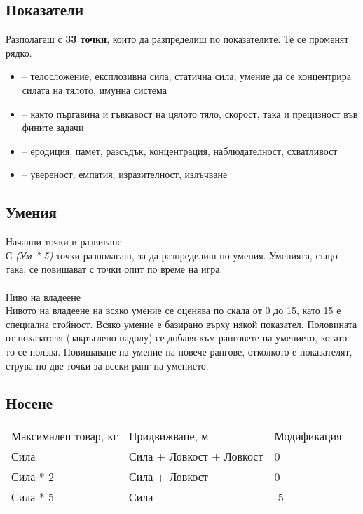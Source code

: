 \subsection{Показатели}
Разполагаш с \textbf{33 точки}, които да разпределиш по показателите. Те се променят рядко.
\begin{itemize}
\item {} – телосложение, експлозивна сила, статична сила, умение да се концентрира силата на тялото, имунна система
\item {} – както пъргавина и гъвкавост на цялото тяло, скорост, така и прецизност във фините задачи
\item {} – еродиция, памет, разсъдък, концентрация, наблюдателност, схватливост
\item {} – увереност, емпатия, изразителност, излъчване
\end{itemize}

\subsection{Умения}
Начални точки и развиване  \\
С \textit{(Ум * 5)} точки разполагаш, за да разпределиш по умения.
Уменията, също така, се повишават с точки опит по време на игра.
\\
\\
Ниво на владеене  \\
Нивото на владеене на всяко умение се оценява по скала от 0 до 15, като 15 е специална стойност.
Всяко умение е базирано върху някой показател.
Половината от показателя (закръглено надолу) се добавя към ранговете на умението, когато то се ползва.
Повишаване на умение на повече рангове,  отколкото е показателят, струва по две точки за всеки ранг на умението.

\subsection{Носене}
\begin{tabular}{l | l | l }
Максимален товар, кг & Придвижване, м            & Модификация  \\
Сила                 & Сила + Ловкост + Ловкост  &  0           \\
Сила * 2             & Сила + Ловкост            &  0           \\
Сила * 5             & Сила                      & -5
\end{tabular}


